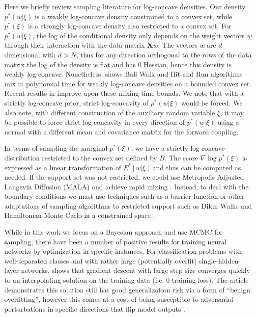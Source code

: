 \documentclass{article}
\numberwithin{equation}{section}
\theoremstyle{Lemma}
\theoremstyle{Corollary}
\theoremstyle{Theorem}
\theoremstyle{Remark}
\begin{document}
Here we briefly review sampling literature for log-concave densities. Our density $p^{*}(w|\xi)$ is a weakly log-concave density constrained to a convex set, while $p^{*}(\xi)$ is a strongly log-concave density also restricted to a convex set. For $p^{*}(w|\xi)$, the log of the conditional density only depends on the weight vectors $w$ through their interaction with the data matrix $\textbf{X}w$. The vectors $w$ are $d$ dimensional with $d>N$, thus for any direction orthogonal to the rows of the data matrix the log of the density is flat and has 0 Hessian, hence this density is weakly log-concave. Nonetheless, \cite{lovasz2007geometry} shows Ball Walk and Hit and Run algorithms mix in polynomial time for weakly log-concave densities on a bounded convex set. Recent results in \cite{kook2024sampling} improve upon these mixing time bounds. We note that with a strictly log-concave prior, strict log-concavity of $p^*(w|\xi)$ would be forced. We also note, with different construction of the auxiliary random variable $\xi$, it may be possible to force strict log-concavity in every direction of $p^{*}(w|\xi)$ using a normal with a different mean and covariance matrix for the forward coupling.

In terms of sampling the marginal $p^{*}(\xi)$, we have a strictly log-concave distribution restricted to the convex set defined by $B$. The score $\nabla \log p^{*}(\xi)$ is expressed as a linear transformation of $E^{*}[w|\xi]$ and thus can be computed as needed. If the support set was not restricted, we could use Metropolis Adjusted Langevin Diffusion (MALA) and achieve rapid mixing \cite{dwivedi2019log}. Instead, to deal with the boundary conditions we must use techniques such as a barrier function \cite{srinivasan2024fast} or other adaptations of sampling algorithms to restricted support such as Dikin Walks \cite{kook2024gaussian} and Hamiltonian Monte Carlo in a constrained space \cite{kook2022sampling}.

While in this work we focus on a Bayesian approach and use MCMC for sampling, there have been a number of positive results for training neural networks by optimization in specific instances. For classification problems with well-separated classes and with rather large (potentially overfit) single-hidden-layer networks, \cite{cai2024large} shows that gradient descent with large step size converges quickly to an interpolating solution on the training data (i.e. 0 training loss). The article \cite{tsigler2023benign} demonstrates this solution still has good generalization risk via a form of ``benign overfitting'', however this comes at a cost of being susceptible to adversarial perturbations in specific directions that flip model outputs \cite{frei2024double}.
\end{document}
